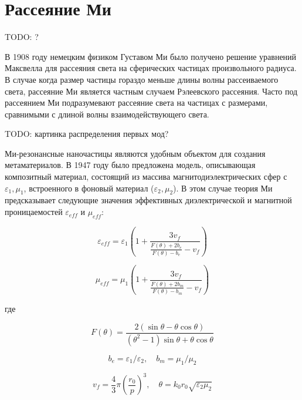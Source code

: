 \section{Рассеяние Ми}

TODO: \cite{Bohren1998} ?

В 1908 году немецким физиком Густавом Ми было получено \cite{Mie1908} решение уравнений Максвелла для рассеяния света на сферических частицах произвольного радиуса. В случае когда размер частицы гораздо меньше длины волны рассеиваемого света, рассеяние Ми является частным случаем Рэлеевского рассеяния. Часто под рассеянием Ми подразумевают рассеяние света на частицах с размерами, сравнимыми с длиной волны взаимодействующего света.

TODO: картинка распределения первых мод?

Ми-резонансные наночастицы являются удобным объектом для создания метаматериалов. В 1947 году было предложена \cite{Lewin1947} модель, описывающая композитный материал, состоящий из массива магнитодиэлектрических сфер с $\varepsilon_1, \mu_1$, встроенного в фоновый материал ($\varepsilon_2, \mu_2$). В этом случае теория Ми предсказывает следующие значения эффективных диэлектрической и магнитной проницаемостей $\varepsilon_{eff}$ и $\mu_{eff}$:

\begin{equation}
	\varepsilon_{eff} = \varepsilon_1 \left(1 + \frac{3 v_f}{ \frac{F(\theta) + 2b_e}{F(\theta) - b_e} - v_f } \right)
\end{equation}

\begin{equation}
	\mu_{eff} = \mu_1 \left(1 + \frac{3 v_f}{ \frac{F(\theta) + 2b_m}{F(\theta) - b_m} - v_f } \right)
\end{equation}

где

\begin{equation}
	F(\theta) = \frac{2 \left( \sin \theta - \theta \cos \theta\right)}{\left( \theta^2 - 1 \right) \sin \theta + \theta \cos \theta}
	\label{eq:resonance function}
\end{equation}

\begin{equation}
	b_e = \varepsilon_1 / \varepsilon_2, \quad b_m = \mu_1 / \mu_2
\end{equation}

\begin{equation}
	v_f = \frac{4}{3} \pi \left( \frac{r_0}{p} \right)^3, \quad \theta = k_0 r_0 \sqrt{\varepsilon_2 \mu_2}
\end{equation}

